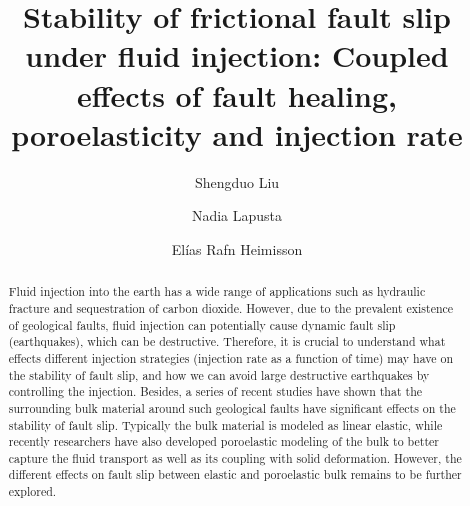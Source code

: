 \documentclass[final,a4paper]{elsarticle}
\begin{document}
\begin{frontmatter}

\title{Stability of frictional fault slip under fluid injection: Coupled effects of fault healing, poroelasticity and injection rate}
            
            
\author[1]{Shengduo Liu}
\author[1,2]{Nadia Lapusta}
\author[3]{El\'{i}as Rafn Heimisson}

\begin{abstract}
Fluid injection into the earth has a wide range of applications such as hydraulic fracture and sequestration of carbon dioxide. 
However, 
due to the prevalent existence of geological faults, 
fluid injection can potentially cause dynamic fault slip (earthquakes), 
which can be destructive. 
Therefore, 
it is crucial to understand what effects different injection strategies (injection rate as a function of time) may have on the stability of fault slip, 
and how we can avoid large destructive earthquakes by controlling the injection. 
Besides, 
a series of recent studies have shown that the surrounding bulk material around such geological faults have significant effects on the stability of fault slip. 
Typically the bulk material is modeled as linear elastic, 
while recently researchers have also developed poroelastic modeling of the bulk to better capture the fluid transport as well as its coupling with solid deformation. 
However, 
the different effects on fault slip between elastic and poroelastic bulk remains to be further explored. 


\end{abstract}
\end{frontmatter}
\end{document}

